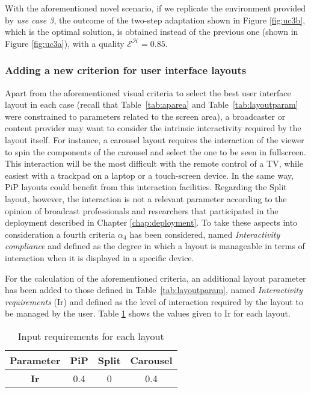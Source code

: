 With the aforementioned novel scenario, if we replicate the environment provided by \textit{use case 3}, the outcome of the two-step adaptation shown in Figure \ref{fig:uc3b}, which is the optimal solution, is obtained instead of the previous one (shown in Figure \ref{fig:uc3a}), with a quality $\mathcal{E}^\mathcal{H} = 0.85$. 

\subsubsection{Adding a new criterion for user interface layouts}

Apart from the aforementioned visual criteria to select the best user interface layout in each case (recall that Table~\ref{tab:aparea} and Table~\ref{tab:layoutparam} were constrained to parameters related to the screen area), a broadcaster or content provider may want to consider the intrinsic interactivity required by the layout itself. 
For instance, a carousel layout requires the interaction of the viewer to spin the components of the carousel and select the one to be seen in fullscreen.
This interaction will be the most difficult with the remote control of a TV, while easiest with a trackpad on a laptop or a touch-screen device.
In the same way, PiP layouts could benefit from this interaction facilities.
Regarding the Split layout, however, the interaction is not a relevant parameter according to the opinion of broadcast professionals and researchers that participated in the deployment described in Chapter \ref{chap:deployment}. 
To take these aspects into consideration a fourth criteria $\alpha_4$ has been considered, named \textit{Interactivity compliance} and defined as the degree in which a layout is manageable in terms of interaction when it is displayed in a specific device.  

For the calculation of the aforementioned criteria, an additional layout parameter has been added to those defined in Table~\ref{tab:layoutparam}, named \textit{Interactivity requirements} (Ir) and defined as the level of interaction required by the layout to be managed by the user. Table \ref{tab:layoutir} shows the values given to Ir for each layout. 

\begin{table}
	\centering
	\caption {Input requirements for each layout}\label{tab:layoutir}
	\begin{tabular}{||c|c|c|c||}
		\hline
		\textbf{Parameter} & \textbf{PiP} & \textbf{Split}  & \textbf{Carousel} \\
		
		\hline
		\textbf{Ir}  & 0.4 & 0 & 0.4\\
		\hline
	\end{tabular}
\end{table}


